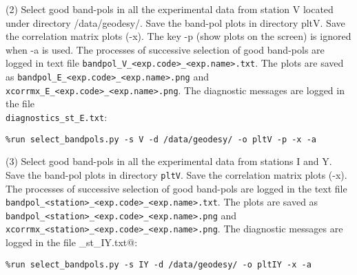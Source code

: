\documentclass[preprint]{aastex}
\begin{document}
(2) Select good band-pols in all the experimental data from station V
located under directory /data/geodesy/. 
Save the band-pol plots in directory pltV. Save the correlation matrix plots
(-x). The key -p (show plots on the screen) is ignored when -a is used.  
The processes of successive selection of good band-pols are
logged in text file \verb$bandpol_V_<exp.code>_<exp.name>.txt$. 
The plots are saved as \verb$bandpol_E_<exp.code>_<exp.name>.png$ and \\
\verb$xcorrmx_E_<exp.code>_<exp.name>.png$.
The diagnostic messages are logged in the file\\
\verb$diagnostics_st_E.txt$:

\verb$%run select_bandpols.py -s V -d /data/geodesy/ -o pltV -p -x -a$

(3) Select good band-pols in all the experimental data from stations
I and Y. Save the band-pol plots in directory \verb$pltV$. Save the correlation matrix
plots (-x).  
The processes of successive selection of good band-pols are logged in the text file \verb$bandpol_<station>_<exp.code>_<exp.name>.txt$. The plots are saved as \verb$bandpol_<station>_<exp.code>_<exp.name>.png$ and \\
\verb$xcorrmx_<station>_<exp.code>_<exp.name>.png$.
The diagnostic messages are logged in the file \verb@diagnostics_st_IY.txt@:

\verb$%run select_bandpols.py -s IY -d /data/geodesy/ -o pltIY -x -a$

%
%
%
%
%
%
%
%
%
%
%
%
%
%
%
%

%  		

\end{document}
